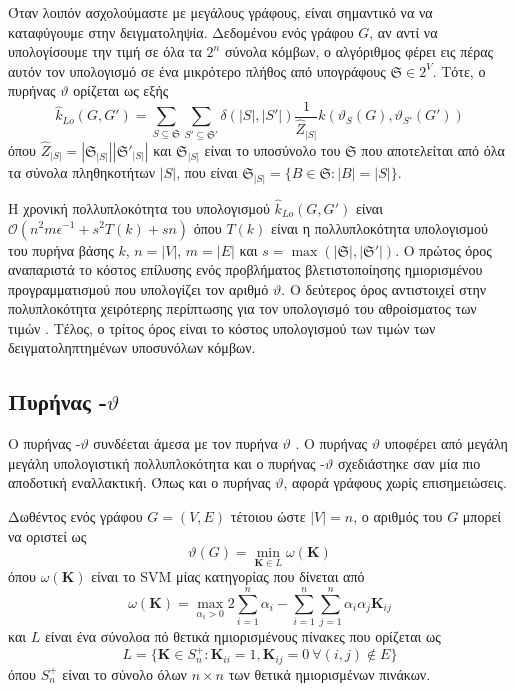 Όταν λοιπόν ασχολούμαστε με μεγάλους γράφους, είναι σημαντικό να να καταφύγουμε στην δειγματοληψία.
Δεδομένου ενός γράφου $G$, αν αντί να υπολογίσουμε την τιμή  σε όλα τα $2^n$ σύνολα κόμβων, ο αλγόριθμος φέρει εις πέρας αυτόν τον υπολογισμό σε ένα μικρότερο πλήθος από υπογράφους $\mathfrak{S} \in 2^V$.
Τότε, ο πυρήνας  $\vartheta$ ορίζεται ως εξής
\begin{equation*}
    \hat{k}_{Lo}(G, G') = \sum_{S \subseteq \mathfrak{S}} \sum_{S' \subseteq \mathfrak{S}'} \delta(|S|, |S'|) \frac{1}{\hat{Z}_{|S|}} k(\vartheta_S(G), \vartheta_{S'}(G'))
\end{equation*}
όπου $\hat{Z}_{|S|} = |\mathfrak{S}_{|S|}| |\mathfrak{S}'_{|S|}|$ και $\mathfrak{S}_{|S|}$ είναι το υποσύνολο του $\mathfrak{S}$ που αποτελείται από όλα τα σύνολα πληθηκοτήτων $|S|$, που είναι $\mathfrak{S}_{|S|} = \{ B \in \mathfrak{S} : |B| = |S| \}$.

Η χρονική πολλυπλοκότητα του υπολογισμού $\hat{k}_{Lo}(G, G')$ είναι $\mathcal{O}(n^2 m \epsilon^{-1} + s^2 T(k) + sn)$ όπου $T(k)$ είναι η πολλυπλοκότητα υπολογισμού του πυρήνα βάσης $k$, $n = |V|$, $m = |E|$ και $s = \max(|\mathfrak{S}|, |\mathfrak{S}'|)$.
Ο πρώτος όρος αναπαριστά το κόστος επίλυσης ενός προβλήματος βλετιστοποίησης ημιορισμένου προγραμματισμού που υπολογίζει τον αριθμό  $\vartheta$.
Ο δεύτερος όρος αντιστοιχεί στην πολυπλοκότητα χειρότερης περίπτωσης για τον υπολογισμό του αθροίσματος των τιμών .
Τέλος, ο τρίτος όρος είναι το κόστος υπολογισμού των τιμών   των δειγματοληπτημένων υποσυνόλων κόμβων.

\subsection{Πυρήνας -$\vartheta$}

Ο πυρήνας -$\vartheta$ συνδέεται άμεσα με τον πυρήνα  $\vartheta$ \cite{johansson2014global}.
Ο πυρήνας  $\vartheta$ υποφέρει από μεγάλη μεγάλη υπολογιστική πολλυπλοκότητα και ο πυρήνας -$\vartheta$ σχεδιάστηκε σαν μία πιο αποδοτική εναλλακτική. 
Όπως και ο πυρήνας  $\vartheta$, αφορά γράφους χωρίς επισημειώσεις.

Δωθέντος ενός γράφου $G=(V,E)$ τέτοιου ώστε $|V| = n$, ο αριθμός  του $G$ μπορεί να οριστεί ως
\begin{equation}
    \vartheta(G) = \min_{\mathbf{K} \in L} \omega(\mathbf{K})
\end{equation}
όπου $\omega(\mathbf{K})$ είναι το SVM μίας κατηγορίας που δίνεται από
\begin{equation}
    \label{eq:oneclass_svm}
    \omega(\mathbf{K}) = \max_{\alpha_i > 0} 2\sum_{i=1}^{n} \alpha_i - \sum_{i=1}^{n} \sum_{j=1}^{n} \alpha_i \alpha_j \mathbf{K}_{ij}
\end{equation}
και $L$ είναι ένα σύνολοα πό θετικά ημιορισμένους πίνακες που ορίζεται ως
\begin{equation}
    L = \{ \mathbf{K} \in S_{n}^+ : \mathbf{K}_{ii} = 1, \mathbf{K}_{ij}=0 \: \forall (i,j) \not \in E \}
\end{equation}
όπου $S_{n}^+$ είναι το σύνολο όλων $n \times n$ των θετικά ημιορισμένων πινάκων.

